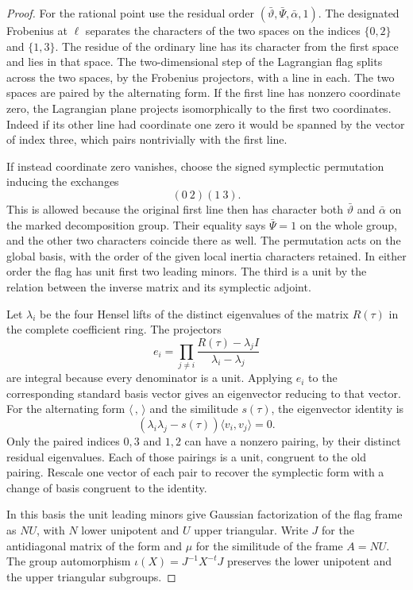 \begin{proof}
For the rational point use the residual order
\((\bar\vartheta,\bar\Psi,\bar\alpha,1)\).
The designated Frobenius at \(\ell\) separates the
characters of the two spaces on the indices
\(\{0,2\}\) and \(\{1,3\}\). The residue of the
ordinary line has its character from the first
space and lies in that space. The two-dimensional
step of the Lagrangian flag splits across the two
spaces, by the Frobenius projectors, with a line in
each. The two spaces are paired by the alternating
form. If the first line has nonzero coordinate zero,
the Lagrangian plane projects isomorphically to the
first two coordinates. Indeed if its other line had
coordinate one zero it would be spanned by the
vector of index three, which pairs nontrivially
with the first line.

If instead coordinate zero vanishes, choose the signed symplectic permutation inducing the exchanges
\[
 (0\ 2)(1\ 3).
\]
This is allowed because the original first line
then has character both \(\bar\vartheta\) and
\(\bar\alpha\) on the marked decomposition group.
Their equality says \(\bar\Psi=1\) on the whole group,
and the other two characters coincide there as well.
The permutation acts on the global basis, with the
order of the given local inertia characters retained.
In either order the flag has unit first two leading
minors. The third is a unit by the relation between
the inverse matrix and its symplectic adjoint.

Let \(\lambda_i\) be the four Hensel lifts of the distinct
eigenvalues of the matrix \(R(\tau)\) in the complete
coefficient ring. The projectors
\[
 e_i=\prod_{j\ne i}\frac{R(\tau)-\lambda_j I}
                              {\lambda_i-\lambda_j}
\]
are integral because every denominator is a unit.
Applying \(e_i\) to the corresponding standard basis vector
gives an eigenvector reducing to that vector. For the
alternating form \(\langle\, , \,\rangle\) and the similitude
\(s(\tau)\), the eigenvector identity is
\[
  (\lambda_i\lambda_j-s(\tau))\langle v_i,v_j\rangle=0 .
\]
Only the paired indices \(0,3\) and \(1,2\) can have a nonzero
pairing, by their distinct residual eigenvalues. Each of
those pairings is a unit, congruent to the old pairing.
Rescale one vector of each pair to recover the symplectic
form with a change of basis congruent to the identity.

In this basis the unit leading minors give Gaussian
factorization of the flag frame as \(N U\), with \(N\) lower
unipotent and \(U\) upper triangular. Write \(J\) for the antidiagonal matrix of the form and \(\mu\) for the similitude of the frame \(A=NU\). The group automorphism \(\iota(X)=J^{-1}X^{-t}J\) preserves the lower unipotent and the upper triangular subgroups.


\end{proof}
